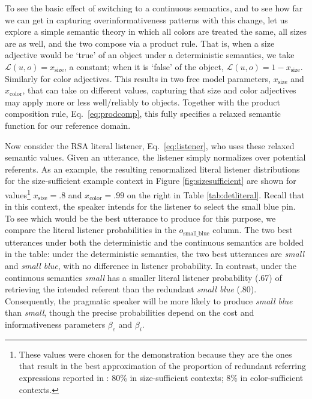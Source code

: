 \documentclass[11pt]{article}
\newcommand{\tableref}[1]{Table \ref{#1}}
\newcommand{\figref}[1]{Figure \ref{#1}}
\begin{document}
To see the basic effect of switching to a continuous semantics, and to see how far we can get in capturing overinformativeness patterns with this change, let us explore a simple semantic theory in which all colors are treated the same, all sizes are as well, and the two compose via a product rule.
That is, when a size adjective would be `true' of an object under a deterministic semantics, we take $\mathcal{L}(u,o) = x_{\text{size}}$, a constant; when it is `false' of the object, $\mathcal{L}(u,o) = 1 - x_{\text{size}}$. 
Similarly for color adjectives. 
This results in two free model parameters, $x_{\text{size}}$ and $x_{\text{color}}$, that can take on different values, capturing that size and color adjectives may apply more or less well/reliably to objects.
Together with the product composition rule, Eq.~\ref{eq:prodcomp}, this fully specifies a relaxed semantic function for our reference domain.

Now consider the RSA literal listener, Eq.~\ref{eq:listener}, who uses these relaxed semantic values.
Given an utterance, the listener simply normalizes over potential referents. 
As an example, the resulting renormalized literal listener distributions for the size-sufficient example context in \figref{fig:sizesufficient} are shown for values\footnote{These values were chosen for the demonstration because they are the ones that result in the best approximation of the proportion of redundant referring expressions reported in : 80\% in size-sufficient contexts; 8\% in color-sufficient contexts.}  $x_{\text{size}} = .8$ and $x_{\text{color}} = .99$ on the right in \tableref{tab:detliteral}. Recall that in this context, the speaker intends for the listener to select the small blue pin. To see which would be the best utterance to produce for this purpose, we compare the literal listener probabilities in the $o_{\text{small\_blue}}$ column. The two best utterances under both the deterministic and the continuous semantics are bolded in the table: under the deterministic semantics, the two best utterances are \emph{small} and \emph{small blue}, with no difference in listener probability. In contrast, under the continuous semantics \emph{small} has a smaller literal listener probability (.67) of retrieving the intended referent than the redundant \emph{small blue} (.80). Consequently, the pragmatic speaker will be more likely to produce \emph{small blue} than \emph{small}, though the precise probabilities depend on the cost and informativeness parameters $\beta_c$ and $\beta_i$. 
\end{document}
